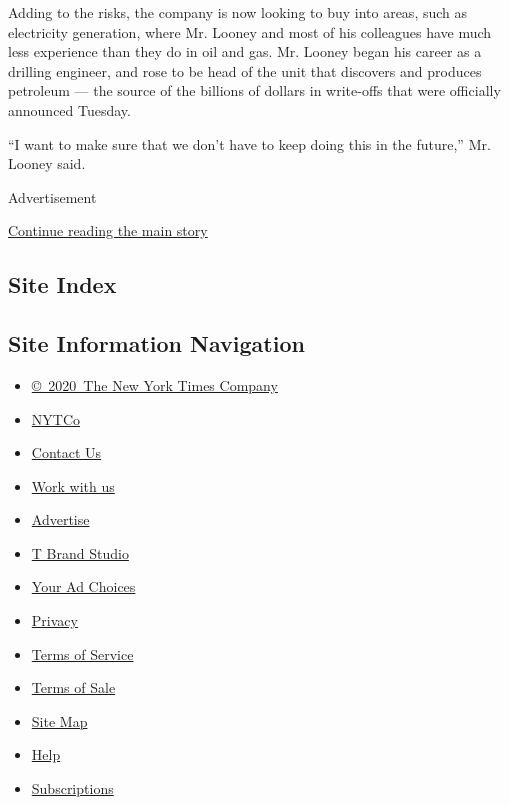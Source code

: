 Adding to the risks, the company is now looking to buy into areas, such
as electricity generation, where Mr. Looney and most of his colleagues
have much less experience than they do in oil and gas. Mr. Looney began
his career as a drilling engineer, and rose to be head of the unit that
discovers and produces petroleum --- the source of the billions of
dollars in write-offs that were officially announced Tuesday.

``I want to make sure that we don't have to keep doing this in the
future,'' Mr. Looney said.

Advertisement

\protect\hyperlink{after-bottom}{Continue reading the main story}

\hypertarget{site-index}{%
\subsection{Site Index}\label{site-index}}

\hypertarget{site-information-navigation}{%
\subsection{Site Information
Navigation}\label{site-information-navigation}}

\begin{itemize}
\tightlist
\item
  \href{https://help.nytimes.com/hc/en-us/articles/115014792127-Copyright-notice}{©~2020~The
  New York Times Company}
\end{itemize}

\begin{itemize}
\tightlist
\item
  \href{https://www.nytco.com/}{NYTCo}
\item
  \href{https://help.nytimes.com/hc/en-us/articles/115015385887-Contact-Us}{Contact
  Us}
\item
  \href{https://www.nytco.com/careers/}{Work with us}
\item
  \href{https://nytmediakit.com/}{Advertise}
\item
  \href{http://www.tbrandstudio.com/}{T Brand Studio}
\item
  \href{https://www.nytimes.com/privacy/cookie-policy\#how-do-i-manage-trackers}{Your
  Ad Choices}
\item
  \href{https://www.nytimes.com/privacy}{Privacy}
\item
  \href{https://help.nytimes.com/hc/en-us/articles/115014893428-Terms-of-service}{Terms
  of Service}
\item
  \href{https://help.nytimes.com/hc/en-us/articles/115014893968-Terms-of-sale}{Terms
  of Sale}
\item
  \href{https://spiderbites.nytimes.com}{Site Map}
\item
  \href{https://help.nytimes.com/hc/en-us}{Help}
\item
  \href{https://www.nytimes.com/subscription?campaignId=37WXW}{Subscriptions}
\end{itemize}
